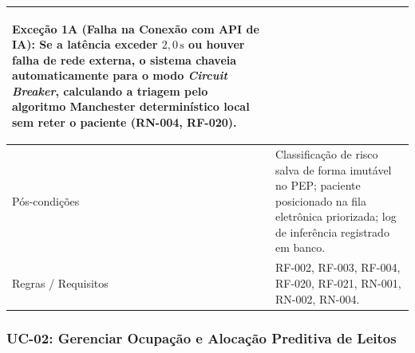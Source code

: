 \begin{tabularx}{\textwidth}{>{\bfseries\raggedright\arraybackslash}p{3.4cm} X}
\textbf{Exceção 1A (Falha na Conexão com API de IA):} Se a latência exceder $2{,}0\,\text{s}$ ou houver falha de rede externa, o sistema chaveia automaticamente para o modo \textit{Circuit Breaker}, calculando a triagem pelo algoritmo Manchester determinístico local sem reter o paciente (RN-004, RF-020). \\
\midrule
Pós-condições & Classificação de risco salva de forma imutável no PEP; paciente posicionado na fila eletrônica priorizada; log de inferência registrado em banco. \\
Regras / Requisitos & RF-002, RF-003, RF-004, RF-020, RF-021, RN-001, RN-002, RN-004. \\
\bottomrule
\end{tabularx}
\endgroup

\subsubsection{UC-02: Gerenciar Ocupação e Alocação Preditiva de Leitos}
\label{sec:uc02}

